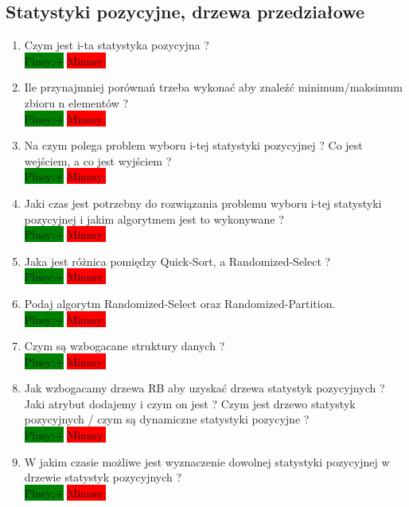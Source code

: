 \documentclass[a4paper,11pt]{article}
\begin{document}
 \subsection{Statystyki pozycyjne, drzewa przedziałowe}
\begin{enumerate}
\item Czym jest i-ta statystyka pozycyjna ? 
\\ \colorbox{green}{Plusy:+} \colorbox{red}{Minusy: } 

\item Ile przynajmniej porównań trzeba wykonać aby znaleźć minimum/maksimum zbioru n elementów ?
\\ \colorbox{green}{Plusy:+} \colorbox{red}{Minusy: } 

\item Na czym polega problem wyboru i-tej statystyki pozycyjnej ? Co jest wejściem, a co jest wyjściem ?
\\ \colorbox{green}{Plusy:+} \colorbox{red}{Minusy: } 

\item Jaki czas jest potrzebny do rozwiązania problemu wyboru i-tej statystyki pozycyjnej i jakim algorytmem jest to wykonywane ?
\\ \colorbox{green}{Plusy:+} \colorbox{red}{Minusy: } 

\item Jaka jest różnica pomiędzy Quick-Sort, a Randomized-Select ? 
\\ \colorbox{green}{Plusy:+} \colorbox{red}{Minusy: } 

\item Podaj algorytm Randomized-Select oraz Randomized-Partition.
\\ \colorbox{green}{Plusy:+} \colorbox{red}{Minusy: } 

\item Czym są wzbogacane struktury danych ? 
\\ \colorbox{green}{Plusy:+} \colorbox{red}{Minusy: } 

\item Jak wzbogacamy drzewa RB aby uzyskać drzewa statystyk pozycyjnych ? Jaki atrybut dodajemy i czym on jest ? Czym jest drzewo statystyk pozycyjnych / czym są dynamiczne statystyki pozycyjne ? 
\\ \colorbox{green}{Plusy:+} \colorbox{red}{Minusy: } 

\item W jakim czasie możliwe jest wyznaczenie dowolnej statystyki pozycyjnej w drzewie statystyk pozycyjnych ?
\\ \colorbox{green}{Plusy:+} \colorbox{red}{Minusy: } 


\end{enumerate}
\end{document}
